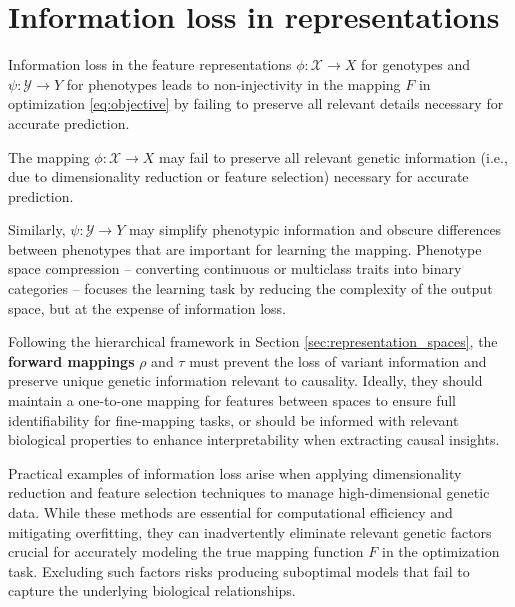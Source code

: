 \documentclass[12pt]{article}
\begin{document}
\section{Information loss in representations}

Information loss in the feature representations $\phi: \mathcal{X} \rightarrow X$ for genotypes and $\psi: \mathcal{Y} \rightarrow Y$ for phenotypes leads to non-injectivity in the mapping $F$ in optimization \ref{eq:objective} by failing to preserve all relevant details necessary for accurate prediction. 

The mapping $\phi: \mathcal{X} \rightarrow X$ may fail to preserve all relevant genetic information (i.e., due to dimensionality reduction or feature selection) necessary for accurate prediction.

Similarly, $\psi: \mathcal{Y} \rightarrow Y$ may simplify phenotypic information and obscure differences between phenotypes that are important for learning the mapping. Phenotype space compression -- converting continuous or multiclass traits into binary categories -- focuses the learning task by reducing the complexity of the output space, but at the expense of information loss. 

Following the hierarchical framework in Section \ref{sec:representation_spaces}, the \textbf{forward mappings} $\rho$ and $\tau$ must prevent the loss of variant information and preserve unique genetic information relevant to causality. Ideally, they should maintain a one-to-one mapping for features between spaces to ensure full identifiability for fine-mapping tasks, or should be informed with relevant biological properties to enhance interpretability when extracting causal insights. 

Practical examples of information loss arise when applying dimensionality reduction and feature selection techniques to manage high-dimensional genetic data. While these methods are essential for computational efficiency and mitigating overfitting, they can inadvertently eliminate relevant genetic factors crucial for accurately modeling the true mapping function $F$ in the optimization task. Excluding such factors risks producing suboptimal models that fail to capture the underlying biological relationships.
\end{document}
